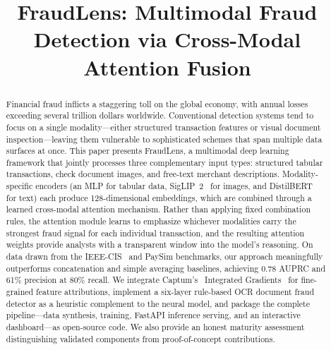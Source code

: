 \documentclass[10pt,conference,letterpaper]{IEEEtran}
\begin{document}
\title{FraudLens: Multimodal Fraud Detection via Cross-Modal Attention Fusion}

\author{
}

\maketitle

\begin{abstract}
Financial fraud inflicts a staggering toll on the global economy, with annual losses
exceeding several trillion dollars worldwide. Conventional detection systems tend to
focus on a single modality---either structured transaction features or visual document
inspection---leaving them vulnerable to sophisticated schemes that span multiple data
surfaces at once. This paper presents FraudLens, a multimodal deep learning framework
that jointly processes three complementary input types: structured tabular transactions,
check document images, and free-text merchant descriptions. Modality-specific encoders
(an MLP for tabular data, SigLIP~2~\cite{SigLIP2} for images, and
DistilBERT~\cite{BERT} for text) each produce 128-dimensional embeddings, which are
combined through a learned cross-modal attention mechanism. Rather than applying fixed
combination rules, the attention module learns to emphasize whichever modalities carry
the strongest fraud signal for each individual transaction, and the resulting attention
weights provide analysts with a transparent window into the model's reasoning. On data
drawn from the IEEE-CIS~\cite{IEICE} and PaySim benchmarks, our approach meaningfully
outperforms concatenation and simple averaging baselines, achieving 0.78 AUPRC and 61\%
precision at 80\% recall. We integrate Captum's~\cite{Captum} Integrated
Gradients~\cite{IntGradients} for fine-grained feature attributions, implement a
six-layer rule-based OCR document fraud detector as a heuristic complement to the
neural model, and package the complete pipeline---data synthesis, training, FastAPI
inference serving, and an interactive dashboard---as open-source code. We also provide
an honest maturity assessment distinguishing validated components from proof-of-concept
contributions.
\end{abstract}
\end{document}
